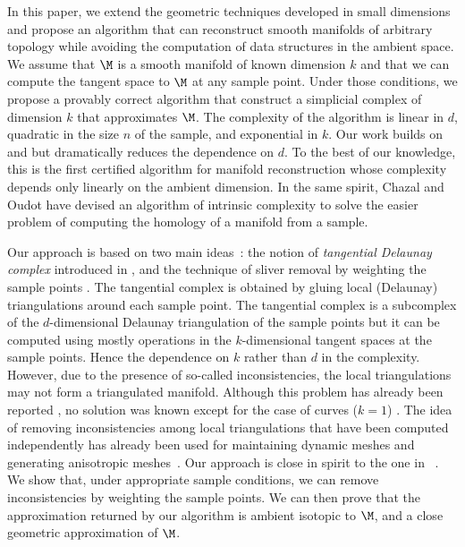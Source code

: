 In this paper, we extend the geometric techniques developed in small
dimensions and propose an algorithm that can reconstruct smooth
manifolds of arbitrary topology while avoiding the computation of data
structures in the ambient space.  We assume that $\M$ is a smooth
manifold of known dimension $k$ and that we can compute the tangent
space to $\M$ at any sample point. Under those conditions, we propose
a provably correct algorithm that %
construct a simplicial
complex of dimension $k$ that approximates $\M$. The complexity of the
algorithm is linear in $d$, quadratic in the size $n$ of the sample,
and exponential in $k$.  Our work builds on \cite{manifold3} and \cite{manifold2} 
but dramatically reduces the dependence on $d$. To
the best of our knowledge, this is the first certified algorithm for
manifold reconstruction whose complexity depends only linearly on the
ambient dimension. In the same spirit, Chazal and Oudot
\cite{persistence} have devised an algorithm of intrinsic complexity
to solve the easier problem of computing the homology of a manifold
from a sample.

Our approach is based on two main ideas~: the notion of {\it
  tangential Delaunay complex} introduced in %
\cite{coordinate-system,thesis1,freeman}, and the technique of sliver
removal by weighting the sample points \cite{sliver1}. The tangential
complex is obtained by gluing local (Delaunay) triangulations around
each sample point. The tangential complex is a subcomplex of the
$d$-dimensional Delaunay triangulation of the sample points but it can
be computed using mostly operations in the $k$-dimensional tangent
spaces at the sample points. Hence the dependence on $k$ rather than
$d$ in the complexity. %
However, due to the presence of so-called
inconsistencies, the local triangulations may not form a triangulated
manifold. Although this problem has already been reported \cite{freeman}, no
solution was known except for the case of curves ($k=1$)
\cite{thesis1}.
The idea of removing inconsistencies among local triangulations that
have been computed independently has already been used
for maintaining dynamic meshes \cite{starsplaying} and generating anisotropic
meshes~\cite{anisotropic1}. Our approach is close in spirit to the one
in ~\cite{anisotropic1}.
We show that,  under appropriate sample conditions, we can remove inconsistencies by weighting the
sample points. We can then prove
that the approximation returned by our algorithm is ambient isotopic to $\M$,
and a close geometric approximation of $\M$.

